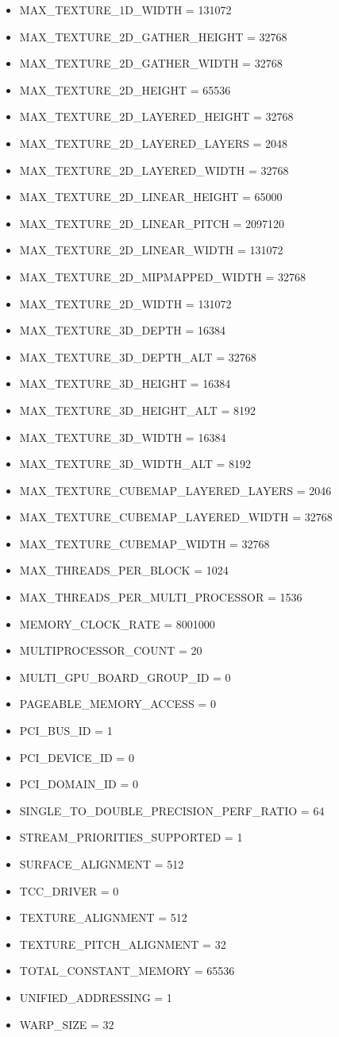 \documentclass{article}
\begin{document}
\begin{itemize}
    \item MAX\_TEXTURE\_1D\_WIDTH = 131072
    \item MAX\_TEXTURE\_2D\_GATHER\_HEIGHT = 32768
    \item MAX\_TEXTURE\_2D\_GATHER\_WIDTH = 32768
    \item MAX\_TEXTURE\_2D\_HEIGHT = 65536
    \item MAX\_TEXTURE\_2D\_LAYERED\_HEIGHT = 32768
    \item MAX\_TEXTURE\_2D\_LAYERED\_LAYERS = 2048
    \item MAX\_TEXTURE\_2D\_LAYERED\_WIDTH = 32768
    \item MAX\_TEXTURE\_2D\_LINEAR\_HEIGHT = 65000
    \item MAX\_TEXTURE\_2D\_LINEAR\_PITCH = 2097120
    \item MAX\_TEXTURE\_2D\_LINEAR\_WIDTH = 131072
    \item MAX\_TEXTURE\_2D\_MIPMAPPED\_WIDTH = 32768
    \item MAX\_TEXTURE\_2D\_WIDTH = 131072
    \item MAX\_TEXTURE\_3D\_DEPTH = 16384
    \item MAX\_TEXTURE\_3D\_DEPTH\_ALT = 32768
    \item MAX\_TEXTURE\_3D\_HEIGHT = 16384
    \item MAX\_TEXTURE\_3D\_HEIGHT\_ALT = 8192
    \item MAX\_TEXTURE\_3D\_WIDTH = 16384
    \item MAX\_TEXTURE\_3D\_WIDTH\_ALT = 8192
    \item MAX\_TEXTURE\_CUBEMAP\_LAYERED\_LAYERS = 2046
    \item MAX\_TEXTURE\_CUBEMAP\_LAYERED\_WIDTH = 32768
    \item MAX\_TEXTURE\_CUBEMAP\_WIDTH = 32768
    \item MAX\_THREADS\_PER\_BLOCK = 1024
    \item MAX\_THREADS\_PER\_MULTI\_PROCESSOR = 1536
    \item MEMORY\_CLOCK\_RATE = 8001000
    \item MULTIPROCESSOR\_COUNT = 20
    \item MULTI\_GPU\_BOARD\_GROUP\_ID = 0
    \item PAGEABLE\_MEMORY\_ACCESS = 0
    \item PCI\_BUS\_ID = 1
    \item PCI\_DEVICE\_ID = 0
    \item PCI\_DOMAIN\_ID = 0
    \item SINGLE\_TO\_DOUBLE\_PRECISION\_PERF\_RATIO = 64
    \item STREAM\_PRIORITIES\_SUPPORTED = 1
    \item SURFACE\_ALIGNMENT = 512
    \item TCC\_DRIVER = 0
    \item TEXTURE\_ALIGNMENT = 512
    \item TEXTURE\_PITCH\_ALIGNMENT = 32
    \item TOTAL\_CONSTANT\_MEMORY = 65536
    \item UNIFIED\_ADDRESSING = 1
    \item WARP\_SIZE = 32
\end{itemize}
\end{document}
